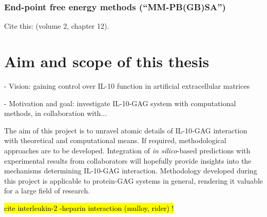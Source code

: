 \subsubsection{End-point free energy methods (\enquote{MM-PB(GB)SA})}
\label{methods:mmpbsa_mmgbsa}


Cite this: \cite{schlick_innovationsdynamics_2012} (volume 2, chapter 12).

\lipsum[1-5]




\section{Aim and scope of this thesis}

- Vision: gaining control over IL-10 function in artificial extracellular matrices

- Motivation and goal: investigate IL-10-GAG system with computational
      methods, in collaboration with...

The aim of this project is to unravel atomic details of IL-10-GAG interaction
with theoretical and computational means. If required, methodological approaches
are to be developed. Integration of \textit{in silico}-based predictions with
experimental results from collaborators will hopefully provide insights into the
mechanisms determining IL-10-GAG interaction. Methodology developed during this
project is applicable to protein-GAG systems in general, rendering it valuable
for a large field of research.



\hl{cite interleukin-2 -heparin interaction (mulloy, rider) !}

\lipsum[1-5]





